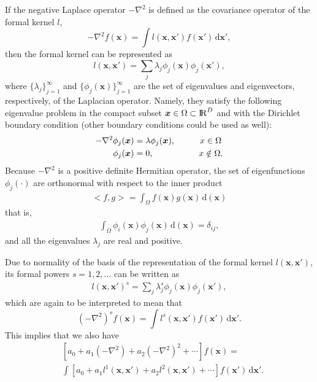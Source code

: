 If the negative Laplace operator $-\nabla^2$ is defined as the covariance operator of the formal kernel $l$,
%
\begin{equation*}
-\nabla^2 f(\bm{x}) = \int l(\bm{x},\bm{x}') f(\bm{x}') \,\mathrm{d}\bm{x}',
\end{equation*} 
then the formal kernel can be represented as 
%
\begin{equation*}
l(\bm{x},\bm{x}')= \sum_j \lambda_j \phi_j(\bm{x}) \phi_j(\bm{x}'),
\end{equation*}
where $\{\lambda_j\}_{j=1}^{\infty}$ and $\{\phi_j(\bm{x})\}_{j=1}^{\infty}$ are the set of eigenvalues and eigenvectors, respectively, of the Laplacian operator. Namely, they satisfy the following eigenvalue problem in the compact subset $\bm{x} \in \Omega \subset {\rm I\!R}^D$ and with the Dirichlet boundary condition (other boundary conditions could be used as well):
%
\begin{align*}
-\nabla^2 \phi_j(\bm{x})&=\lambda \phi_j(\bm{x}), \hspace{1cm}  x\in \Omega \nonumber \\ 
\phi_j(\bm{x})&=0, \hspace{1.85cm} x\notin \Omega.
\end{align*}  
Because $-\nabla^2$ is a positive definite Hermitian operator, the set of eigenfunctions $\phi_j(\cdot)$ are orthonormal with respect to the inner product
%
\begin{align*}
<f,g>=\int_\Omega f(\bm{x}) g(\bm{x}) \,\mathrm{d}(\bm{x})
\end{align*} 
that is,
%
\begin{align*}
\int_\Omega \phi_i(\bm{x}) \phi_j(\bm{x}) \,\mathrm{d}(\bm{x}) = \delta_{ij},
\end{align*} 
and all the eigenvalues $\lambda_j$ are real and positive. 

Due to normality of the basis of the representation of the formal kernel $l(\bm{x},\bm{x}')$, its formal powers $s=1,2,\dots$ can be written as
%
\begin{eqnarray}\label{eq_formalkernel}
l(\bm{x},\bm{x}')^s= \sum_j \lambda_j^s \phi_j(\bm{x}) \phi_j(\bm{x}'),
\end{eqnarray} 
which are again to be interpreted to mean that
%
\begin{equation*}
(-\nabla^2)^s f(\bm{x}) = \int l^s(\bm{x},\bm{x}') f(\bm{x}') \,\mathrm{d}\bm{x}'.
\end{equation*} 
This implies that we also have
%
\begin{align*}
&[a_0+a_1(-\nabla^2)+a_2(-\nabla^2)^2+\cdots] f(\bm{x}) = \\
& \int [a_0+a_1l^1(\bm{x},\bm{x}')+a_2l^2(\bm{x},\bm{x}')+\cdots] f(\bm{x}')  \,\mathrm{d}\bm{x}'.
\end{align*} 

